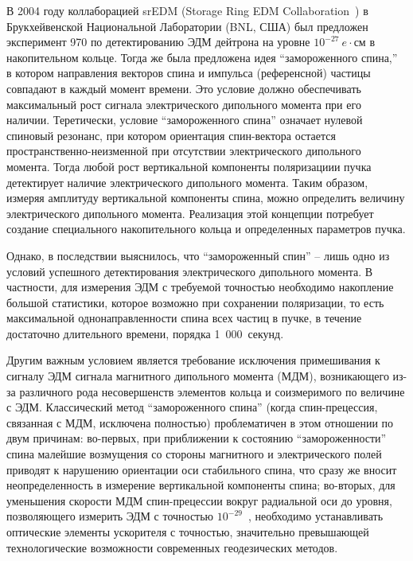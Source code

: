 В 2004 году коллаборацией srEDM (Storage Ring EDM Collaboration~\cite{BNL:SREDM}) 
в Брукхейвенской Национальной Лаборатории (BNL, США) был предложен эксперимент 970 
по детектированию ЭДМ дейтрона на уровне $10^{-27}~e\cdot$см в накопительном кольце. 
Тогда же была предложена идея ``замороженного спина,''~\cite{Farley:SREDM:Muon} 
в котором направления векторов спина и импульса (референсной) частицы совпадают в каждый момент времени. Это условие должно обеспечивать максимальный рост сигнала электрического дипольного момента при его наличии. Теретически, условие ``замороженного спина'' означает нулевой спиновый резонанс, при котором ориентация спин-вектора остается  пространственно-неизменной при отсутствии электрического дипольного момента. 
Тогда любой рост вертикальной компоненты поляризациии пучка детектирует наличие электрического дипольного момента. Таким образом, измеряя  амплитуду вертикальной компоненты спина, можно определить величину электрического дипольного момента. Реализация этой концепции потребует создание специального накопительного кольца и определенных параметров пучка.

Однако, в последствии выяснилось, что ``замороженный спин'' -- лишь одно из условий успешного детектирования электрического дипольного момента. В частности, для измерения ЭДМ с требуемой точностью необходимо накопление большой статистики, которое возможно при сохранении поляризации, то есть максимальной однонаправленности спина всех частиц в пучке, в течение достаточно длительного времени, порядка 1~000~секунд. 

Другим важным условием является требование исключения примешивания к сигналу ЭДМ 
сигнала магнитного дипольного момента (МДМ), возникающего из-за различного рода несовершенств 
элементов кольца и соизмеримого по величине с ЭДМ. 
Классический метод ``замороженного спина'' (когда спин-прецессия, связанная с МДМ, исключена полностью) проблематичен в этом отношении по двум причинам: 
во-первых, при приближении к состоянию ``замороженности'' спина малейшие возмущения со стороны магнитного и электрического полей приводят к нарушению ориентации оси стабильного спина, что сразу же вносит неопределенность в измерение вертикальной компоненты спина; 
во-вторых, для уменьшения скорости МДМ спин-прецессии вокруг радиальной оси до уровня, позволяющего измерить ЭДМ с точностью $10^{-29}$~\ecm, необходимо устанавливать оптические элементы ускорителя с точностью, значительно превышающей технологические возможности современных геодезических методов.


